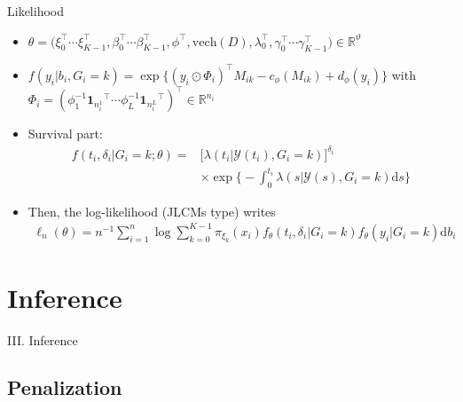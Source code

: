 \documentclass{beamer}
\newcommand{\dd}{\mathrm{d}}
\newcommand{\R}{\mathbb R}
\newcommand{\cY}{\mathcal Y}
\begin{document}
\begin{frame}{Likelihood}

\footnotesize
\begin{itemize}
  \item<1-> \scriptsize $\theta = \big(\xi_0^\top \cdots \xi_{K-1}^\top, \beta_0^\top \cdots \beta_{K-1}^\top, \phi^\top, \text{vech}(D), \lambda_0^\top, \gamma_0^\top \cdots \gamma_{K-1}^\top\big) \in \R^\vartheta$ 
  \item<2-> $f(y_i|b_i, G_i=k) = \exp \big\{(y_i \odot \Phi_i)^\top M_{ik} - c_\phi(M_{ik}) + d_\phi(y_i) \big\}$ with $\Phi_i = (\phi_1^{-1} {\textbf{1}_{n_i^1}}^\top \cdots \phi_L^{-1} {\textbf{1}_{n_i^L}}^\top)^\top \in \R^{n_i}$
  \item<3-> Survival part: 
  \begin{align*}f(t_i, \delta_i| G_i = k ; \theta) = &\big[\lambda(t_i|\cY(t_i), G_i = k)\big]^{\delta_i} \\ & \times \exp \Big\{-\int_0^{t_i} \lambda(s|\cY(s), G_i = k) \dd s \Big\}
  \end{align*}
  \item<4-> Then, the log-likelihood (JLCMs type) writes
  \begin{align*}\ell_n(\theta) = n^{-1} \sum_{i=1}^n \log \sum_{k=0}^{K-1} \pi_{\xi_k}(x_i) f_\theta(t_i, \delta_i| G_i = k) f_\theta(y_i | G_i = k) \dd b_i
  \end{align*}
\end{itemize}

\end{frame}

\section{Inference}

\begin{frame}[noframenumbering]
\Large \centering
\textcolor{blue_pres}{III.} Inference
\end{frame}

\subsection{Penalization}
\end{document}
